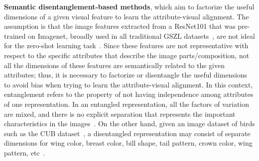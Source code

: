 \vspace{0.05in}
\textbf{Semantic disentanglement-based methods}, which aim to factorize the useful dimensions of a given visual feature to learn the attribute-visual alignment. The assumption is that the image features extracted from a ResNet101 that was pre-trained on Imagenet, broadly used in all traditional GSZL datasets~\cite{CUB, SUN, AWA2}, are not ideal for the zero-shot learning task~\cite{Tong2019HierarchicalDO, Chen2021FREE, SDGZSL}. Since these features are not representative with respect to the specific attributes that describe the image parts/composition, not all the dimensions of these features are semantically related to the given attributes; thus, it is necessary to factorize or disentangle the useful dimensions to avoid bias when trying to learn the attribute-visual alignment.
In this context, entanglement refers to the property of not having independence among attributes of one representation. In an entangled representation, all the factors of variation are mixed, and there is no explicit separation that represents the important characteristics in the images~\cite{Bengio2013RepresentationLA}. On the other hand, given an image dataset of birds such as the CUB dataset~\cite{CUB}, a disentangled representation may consist of separate dimensions for wing color, breast color, bill shape, tail pattern, crown color, wing pattern, etc~\cite{Eastwood2018AFF}.

